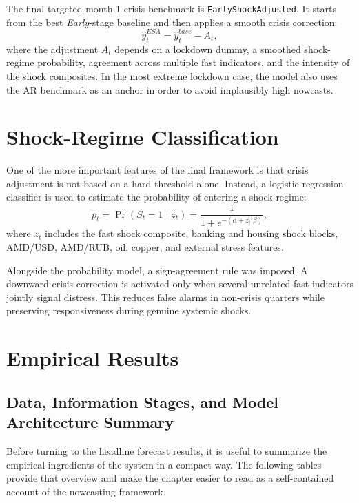 \documentclass[12pt,a4paper]{article}
\begin{document}
The final targeted month-1 crisis benchmark is \texttt{EarlyShockAdjusted}. It starts from the best \textit{Early}-stage baseline and then applies a smooth crisis correction:
\begin{equation}
    \hat{y}^{ESA}_t = \hat{y}^{base}_t - A_t,
\end{equation}
where the adjustment $A_t$ depends on a lockdown dummy, a smoothed shock-regime probability, agreement across multiple fast indicators, and the intensity of the shock composites. In the most extreme lockdown case, the model also uses the AR benchmark as an anchor in order to avoid implausibly high nowcasts.

\section{Shock-Regime Classification}

One of the more important features of the final framework is that crisis adjustment is not based on a hard threshold alone. Instead, a logistic regression classifier is used to estimate the probability of entering a shock regime:
\begin{equation}
    p_t = \Pr(S_t = 1 \mid z_t) = \frac{1}{1 + e^{-(\alpha + z_t'\beta)}},
\end{equation}
where $z_t$ includes the fast shock composite, banking and housing shock blocks, AMD/USD, AMD/RUB, oil, copper, and external stress features.

Alongside the probability model, a sign-agreement rule was imposed. A downward crisis correction is activated only when several unrelated fast indicators jointly signal distress. This reduces false alarms in non-crisis quarters while preserving responsiveness during genuine systemic shocks.

\section{Empirical Results}

\subsection{Data, Information Stages, and Model Architecture Summary}

Before turning to the headline forecast results, it is useful to summarize the empirical ingredients of the system in a compact way. The following tables provide that overview and make the chapter easier to read as a self-contained account of the nowcasting framework.
\end{document}
